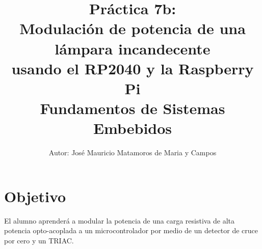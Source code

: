 \documentclass[letterpaper,10.5pt]{article}
\author{\footnotesize Autor: José Mauricio Matamoros de Maria y Campos}
\title{Práctica 7b:\\Modulación de potencia de una lámpara incandecente\\usando el RP2040 y la Raspberry Pi\\
{\large Fundamentos de Sistemas Embebidos}}
\date{}
\begin{document}
\maketitle

\section{Objetivo}%
\label{sec:objective}
El alumno aprenderá a modular la potencia de una carga resistiva de alta potencia opto-acoplada a un microcontrolador por medio de un detector de cruce por cero y un TRIAC.



\cleardoublepage




\appendix


\end{document}
